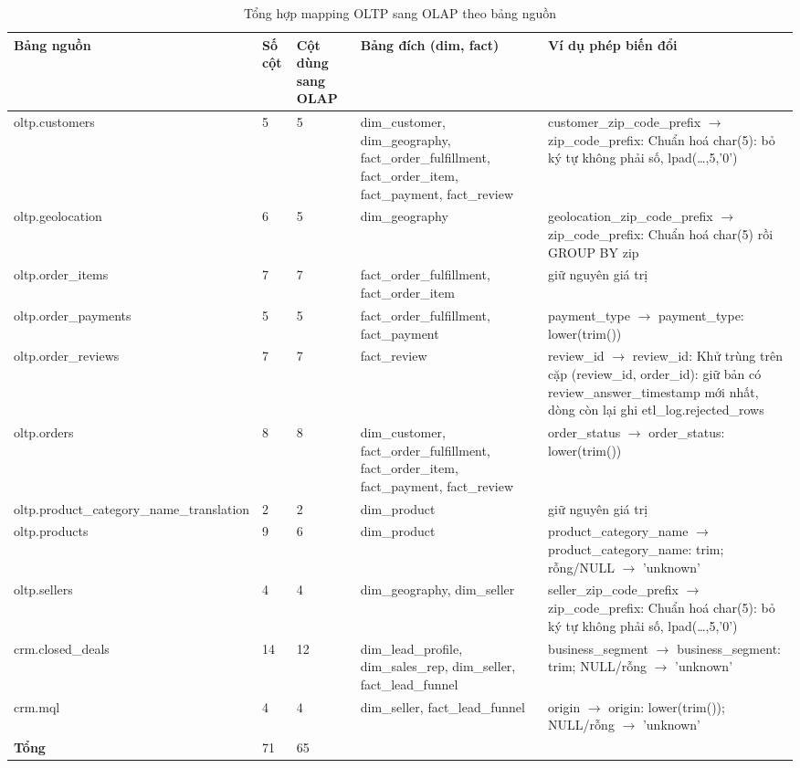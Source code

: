 \begin{table}[htbp]\centering\scriptsize\caption{Tổng hợp mapping OLTP sang OLAP theo bảng nguồn}\label{tab:mapping-tong-hop}
\begin{tabular}{p{2.68cm}p{0.89cm}p{1.25cm}p{4.47cm}p{4.29cm}}\toprule
\textbf{Bảng nguồn} & \textbf{Số cột} & \textbf{Cột dùng sang OLAP} & \textbf{Bảng đích (dim, fact)} & \textbf{Ví dụ phép biến đổi}\\\midrule
oltp.customers & 5 & 5 & dim\_customer, dim\_geography, fact\_order\_fulfillment, fact\_order\_item, fact\_payment, fact\_review & customer\_zip\_code\_prefix $\rightarrow$ zip\_code\_prefix: Chuẩn hoá char(5): bỏ ký tự không phải số, lpad(…,5,'0')\\
oltp.geolocation & 6 & 5 & dim\_geography & geolocation\_zip\_code\_prefix $\rightarrow$ zip\_code\_prefix: Chuẩn hoá char(5) rồi GROUP BY zip\\
oltp.order\_items & 7 & 7 & fact\_order\_fulfillment, fact\_order\_item & giữ nguyên giá trị\\
oltp.order\_payments & 5 & 5 & fact\_order\_fulfillment, fact\_payment & payment\_type $\rightarrow$ payment\_type: lower(trim())\\
oltp.order\_reviews & 7 & 7 & fact\_review & review\_id $\rightarrow$ review\_id: Khử trùng trên cặp (review\_id, order\_id): giữ bản có review\_answer\_timestamp mới nhất, dòng còn lại ghi etl\_log.rejected\_rows\\
oltp.orders & 8 & 8 & dim\_customer, fact\_order\_fulfillment, fact\_order\_item, fact\_payment, fact\_review & order\_status $\rightarrow$ order\_status: lower(trim())\\
oltp.product\_category\_name\_translation & 2 & 2 & dim\_product & giữ nguyên giá trị\\
oltp.products & 9 & 6 & dim\_product & product\_category\_name $\rightarrow$ product\_category\_name: trim; rỗng/NULL $\rightarrow$ 'unknown'\\
oltp.sellers & 4 & 4 & dim\_geography, dim\_seller & seller\_zip\_code\_prefix $\rightarrow$ zip\_code\_prefix: Chuẩn hoá char(5): bỏ ký tự không phải số, lpad(…,5,'0')\\
crm.closed\_deals & 14 & 12 & dim\_lead\_profile, dim\_sales\_rep, dim\_seller, fact\_lead\_funnel & business\_segment $\rightarrow$ business\_segment: trim; NULL/rỗng $\rightarrow$ 'unknown'\\
crm.mql & 4 & 4 & dim\_seller, fact\_lead\_funnel & origin $\rightarrow$ origin: lower(trim()); NULL/rỗng $\rightarrow$ 'unknown'\\
\midrule
\textbf{Tổng} & 71 & 65 & & \\
\bottomrule\end{tabular}\end{table}
